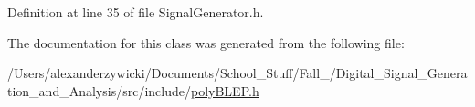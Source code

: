 Definition at line 35 of file Signal\+Generator.\+h.



The documentation for this class was generated from the following file\+:\begin{DoxyCompactItemize}
\item 
/\+Users/alexanderzywicki/\+Documents/\+School\+\_\+\+Stuff/\+Fall\+\_/\+Digital\+\_\+\+Signal\+\_\+\+Generation\+\_\+and\+\_\+\+Analysis/src/include/\hyperlink{poly_b_l_e_p_8h}{poly\+B\+L\+E\+P.\+h}\end{DoxyCompactItemize}
